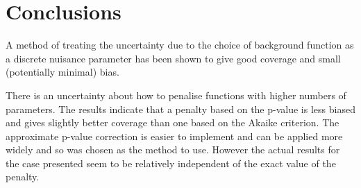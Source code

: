 \section{Conclusions} %
\label{sec:conclusions}

A method of treating the uncertainty due to the choice of background function
as a discrete nuisance parameter has been shown to give good coverage and
small (potentially minimal) bias.

There is an uncertainty about how to penalise functions with higher numbers
of parameters. The results indicate that a penalty based on the p-value
is less biased and gives slightly better coverage than one based on the
Akaike criterion. The approximate p-value correction is easier to implement and
can be applied more widely and so was chosen as the method to use.
However the actual results for the case presented
seem to be relatively independent of the exact value of the penalty.


